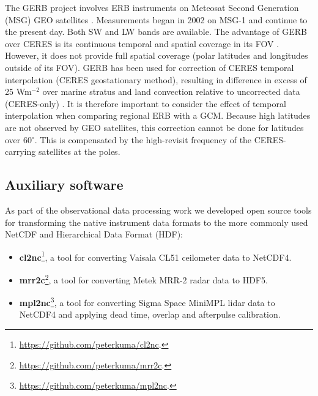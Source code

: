 The GERB project involves ERB instruments
on Meteosat Second Generation (MSG) GEO satellites \citep{harries2005}.
Measurements began in 2002 on MSG-1 and continue to the present day.
Both SW and LW bands are available. The advantage of GERB
over CERES is its continuous temporal and spatial coverage in its FOV
\citep{sandford2003}. However, it does not provide full spatial coverage
(polar latitudes and longitudes outside of its FOV).
GERB has been used for correction of CERES temporal interpolation
(CERES geostationary method), resulting in difference in excess of 25 Wm$^{-2}$
over marine stratus and land convection relative to uncorrected data
(CERES-only) \citep{doelling2013}. It is therefore important to consider
the effect of temporal interpolation when comparing regional ERB with a GCM.
Because high latitudes are not observed by GEO satellites, this correction
cannot be done for latitudes over 60$^{\circ}$. This is compensated by the high-revisit
frequency of the CERES-carrying satellites at the poles.


\subsection{Auxiliary software}

As part of the observational data processing work we developed
open source tools for transforming the native instrument data formats to
the more commonly used NetCDF and Hierarchical Data Format (HDF):

\begin{itemize}
\item \textbf{cl2nc}\footnote{\url{https://github.com/peterkuma/cl2nc}.}, a tool for converting Vaisala CL51
ceilometer data to NetCDF4.
\item \textbf{mrr2c}\footnote{\url{https://github.com/peterkuma/mrr2c}.}, a tool for converting
Metek MRR-2 radar data to HDF5.
\item \textbf{mpl2nc}\footnote{\url{https://github.com/peterkuma/mpl2nc}.}, a
tool for converting Sigma Space MiniMPL lidar data to NetCDF4 and applying
dead time, overlap and afterpulse calibration.
\end{itemize}

